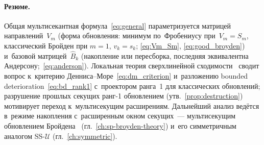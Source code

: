 \paragraph{Резюме.}
Общая мультисекантная формула~\eqref{eq:general} параметризуется
матрицей направлений~$V_m$ (форма обновления: минимум по~Фробениусу
при~$V_m = S_m$, классический Бройден при $m=1$, $v_k = s_k$;
\eqref{eq:Vm_Sm}, \eqref{eq:good_broyden}) и~базовой
матрицей~$\widehat{B}_k$ (накопление или пересборка, последняя
эквивалентна Андерсону;~\eqref{eq:anderson}). Локальная теория
сверхлинейной сходимости~\cite{broyden1973,dennis1974,dennis1977}
сводит вопрос к~критерию Денниса--Море~\eqref{eq:dm_criterion}
и~разложению bounded deterioration~\eqref{eq:bd_rank1} с~проектором
ранга~1 для классических обновлений; разрушение прошлых секущих
ранг-1 обновлением (утв.~\ref{prop:destruction}) мотивирует переход
к~мультисекущим расширениям. Дальнейший анализ ведётся в~режиме
накопления с~расширенным окном секущих~--- мультисекущим обновлением
Бройдена~\cite{schnabel1983} (гл.~\ref{ch:sp-broyden-theory})
и~его симметричным аналогом
SS-$\mathcal{U}$ (гл.~\ref{ch:symmetric}).


